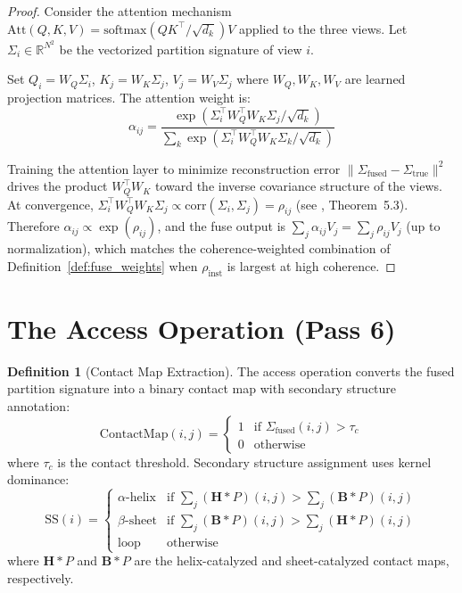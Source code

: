 \documentclass[11pt,twocolumn,a4paper]{article}
\theoremstyle{definition}
\newtheorem{definition}[theorem]{Definition}
\theoremstyle{remark}
\newcommand{\Sig}{\Sigma}
\newcommand{\R}{\mathbb{R}}
\begin{document}
\begin{proof}
Consider the attention mechanism $\text{Att}(Q, K, V) = \text{softmax}(QK^\top / \sqrt{d_k}) V$ applied to the three views. Let $\Sig_i \in \R^{N^2}$ be the vectorized partition signature of view $i$.

Set $Q_i = W_Q \Sig_i$, $K_j = W_K \Sig_j$, $V_j = W_V \Sig_j$ where $W_Q, W_K, W_V$ are learned projection matrices. The attention weight is:
\begin{equation}
\alpha_{ij} = \frac{\exp(\Sig_i^\top W_Q^\top W_K \Sig_j / \sqrt{d_k})}{\sum_k \exp(\Sig_i^\top W_Q^\top W_K \Sig_k / \sqrt{d_k})}
\end{equation}

Training the attention layer to minimize reconstruction error $\|\Sig_{\text{fused}} - \Sig_{\text{true}}\|^2$ drives the product $W_Q^\top W_K$ toward the inverse covariance structure of the views. At convergence, $\Sig_i^\top W_Q^\top W_K \Sig_j \propto \text{corr}(\Sig_i, \Sig_j) = \rho_{ij}$ (see \citet{sachikonye2025_partition}, Theorem~5.3). Therefore $\alpha_{ij} \propto \exp(\rho_{ij})$, and the fuse output is $\sum_j \alpha_{ij} V_j = \sum_j \rho_{ij} V_j$ (up to normalization), which matches the coherence-weighted combination of Definition~\ref{def:fuse_weights} when $\rho_{\text{inst}}$ is largest at high coherence.
\end{proof}

\section{The Access Operation (Pass 6)}
\label{sec:access}

\begin{definition}[Contact Map Extraction]
\label{def:access}
The access operation converts the fused partition signature into a binary contact map with secondary structure annotation:
\begin{equation}
\text{ContactMap}(i, j) = \begin{cases}
1 & \text{if } \Sig_{\text{fused}}(i, j) > \tau_c \\
0 & \text{otherwise}
\end{cases}
\end{equation}
where $\tau_c$ is the contact threshold. Secondary structure assignment uses kernel dominance:
\begin{equation}
\text{SS}(i) = \begin{cases}
\alpha\text{-helix} & \text{if } \sum_j (\mathbf{H} * P)(i, j) > \sum_j (\mathbf{B} * P)(i, j) \\
\beta\text{-sheet} & \text{if } \sum_j (\mathbf{B} * P)(i, j) > \sum_j (\mathbf{H} * P)(i, j) \\
\text{loop} & \text{otherwise}
\end{cases}
\end{equation}
where $\mathbf{H} * P$ and $\mathbf{B} * P$ are the helix-catalyzed and sheet-catalyzed contact maps, respectively.
\end{definition}
\end{document}
